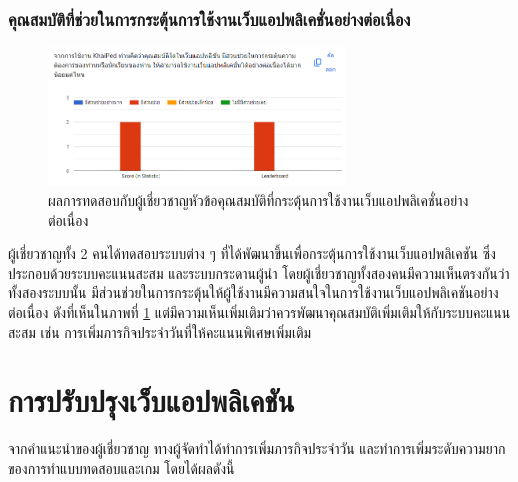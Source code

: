 \documentclass[12pt,oneside,openright,a4paper]{cpe-thai-project}
\begin{document}
\subsubsection{คุณสมบัติที่ช่วยในการกระตุ้นการใช้งานเว็บแอปพลิเคชั่นอย่างต่อเนื่อง}
\begin{figure}[!h]\centering
	\includegraphics[width=0.7\textwidth, keepaspectratio=true]{image/chap4/Improve/addict.png}
	\caption{{ผลการทดสอบกับผู้เชี่ยวชาญหัวข้อคุณสมบัติที่กระตุ้นการใช้งานเว็บแอปพลิเคชั่นอย่างต่อเนื่อง}}\label{fig:chap4Addict}
\end{figure}
\hspace{1cm}
ผู้เชี่ยวชาญทั้ง 2 คนได้ทดสอบระบบต่าง ๆ ที่ได้พัฒนาขึ้นเพื่อกระตุ้นการใช้งานเว็บแอปพลิเคชัน ซึ่งประกอบด้วยระบบคะแนนสะสม และระบบกระดานผู้นำ
โดยผู้เชี่ยวชาญทั้งสองคนมีความเห็นตรงกันว่าทั้งสองระบบนั้น มีส่วนช่วยในการกระตุ้นให้ผู้ใช้งานมีความสนใจในการใช้งานเว็บแอปพลิเคชันอย่างต่อเนื่อง
ดังที่เห็นในภาพที่ \ref{fig:chap4Addict}
แต่มีความเห็นเพิ่มเติมว่าควรพัฒนาคุณสมบัติเพิ่มเติมให้กับระบบคะแนนสะสม เช่น การเพิ่มภารกิจประจำวันที่ให้คะแนนพิเศษเพิ่มเติม

\pagebreak
\section{การปรับปรุงเว็บแอปพลิเคชัน}
\hspace{1cm}
จากคำแนะนำของผู้เชี่ยวชาญ ทางผู้จัดทำได้ทำการเพิ่มภารกิจประจำวัน และทำการเพิ่มระดับความยากของการทำแบบทดสอบและเกม
โดยได้ผลดังนี้
\end{document}
